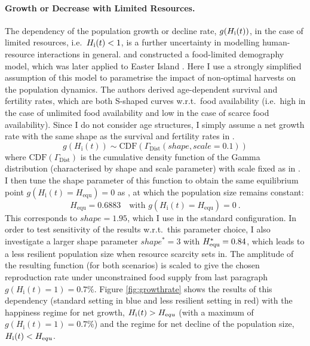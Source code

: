 \paragraph{Growth or Decrease with Limited Resources.}
The dependency of the population growth or decline rate, $g(H_{\rm i}(t))$, in the case of limited resources, i.e.\ $H_{\rm i}(t)<1$, is a further uncertainty in modelling human-resource interactions in general.
\citet{Lee2008} and \citet{Puleston2008} constructed a food-limited demography model, which was later applied to Easter Island \citep{Puleston2017}. 
Here I use a strongly simplified assumption of this model to parametrise the impact of non-optimal harvests on the population dynamics. 
The authors derived age-dependent survival and fertility rates, which are both S-shaped curves w.r.t.\ food availability (i.e.\ high in the case of unlimited food availability and low in the case of scarce food availability).
Since I do not consider age structures, I simply assume a net growth rate with the same shape as the survival and fertility rates in \citet{Lee2008}.
\begin{equation}
g(H_\text{i}(t)) \sim \text{CDF}(\Gamma_\text{Dist}(shape, scale=0.1))
\end{equation}
where $\text{CDF}(\Gamma_\text{Dist})$ is the cumulative density function of the Gamma distribution (characterised by shape and scale parameter) with scale fixed as in \citet{Lee2008}.
I then tune the shape parameter of this function to obtain the same equilibrium point $g(H_\text{i}(t) =H_\text{equ})=0$ as \citet{Puleston2017}, at which the population size remains constant:
\begin{equation}
H_\text{equ}=0.6883 \quad \text{with } g(H_\text{i}(t) = H_\text{equ})=0   \ .
\end{equation} 
This corresponds to $shape=1.95$, which I use in the standard configuration.
In order to test sensitivity of the results w.r.t.\ this parameter choice, I also investigate a larger shape parameter $shape^*=3$ with $H_{\rm equ}^*=0.84$, which leads to a less resilient population size when resource scarcity sets in.
The amplitude of the resulting function (for both scenarios) is scaled to give the chosen reproduction rate under unconstrained food supply from last paragraph 
$g(H_\text{i}(t)=1)=0.7\%$.
Figure \ref{fig:growthrate} shows the results of this dependency (standard setting in blue and less resilient setting in red) with the happiness regime for net growth, $H_\text{i}(t) > H_{\text equ}$ (with a maximum of $g(H_\text{i}(t)=1)=0.7\%$) and the regime for net decline of the population size, $H_\text{i}(t) < H_{\text equ}$.
